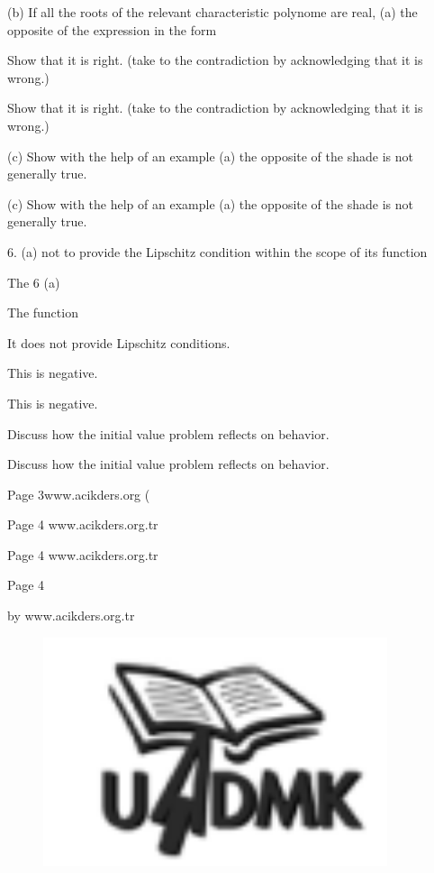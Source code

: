 \documentclass[12pt]{article}
\begin{document}
(b) If all the roots of the relevant characteristic polynome are real, (a) the opposite of the expression in the form

Show that it is right. (take to the contradiction by acknowledging that it is wrong.)

Show that it is right. (take to the contradiction by acknowledging that it is wrong.)

(c) Show with the help of an example (a) the opposite of the shade is not generally true.

(c) Show with the help of an example (a) the opposite of the shade is not generally true.

6. (a) not to provide the Lipschitz condition within the scope of its function

The 6 (a)

The function

It does not provide Lipschitz conditions.

This is negative.

This is negative.

Discuss how the initial value problem reflects on behavior.

Discuss how the initial value problem reflects on behavior.

Page 3www.acikders.org (

Page 4 www.acikders.org.tr

Page 4 www.acikders.org.tr

Page 4

by www.acikders.org.tr


\clearpage
\begin{figure}[ht]
\centering
\includegraphics[width=0.9\textwidth]{PS4_page_1_img_0.png}
\end{figure}
\end{document}
